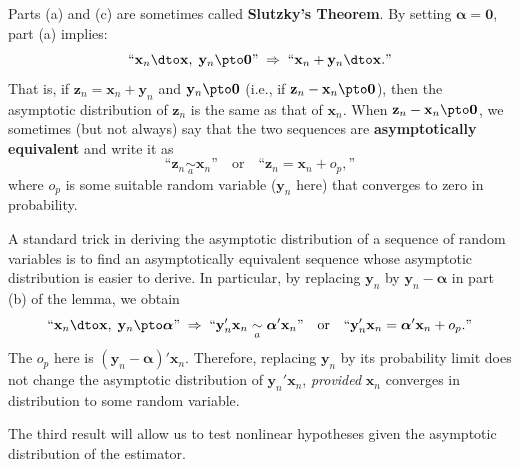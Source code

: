 Parts (a) and (c) are sometimes called \textbf{Slutzky's Theorem}.  By setting
$\bm{\alpha} = \mathbf{0}$, part (a) implies:
\begin{equation}
  \text{``}\mathbf{x}_n \dto \mathbf{x},\;
  \mathbf{y}_n \pto \mathbf{0}\text{''} \;\Rightarrow\;
  \text{``}\mathbf{x}_n + \mathbf{y}_n \dto \mathbf{x}.\text{''}
  \label{eq:2.1.7}
\end{equation}
That is, if $\mathbf{z}_n = \mathbf{x}_n + \mathbf{y}_n$ and
$\mathbf{y}_n \pto \mathbf{0}$ (i.e., if $\mathbf{z}_n - \mathbf{x}_n \pto \mathbf{0}$),
then the asymptotic distribution of $\mathbf{z}_n$ is the same as that of
$\mathbf{x}_n$.  When $\mathbf{z}_n - \mathbf{x}_n \pto \mathbf{0}$, we sometimes
(but not always) say that the two sequences are \textbf{asymptotically equivalent}
and write it as
\[
  \text{``}\mathbf{z}_n \underset{a}{\sim} \mathbf{x}_n\text{''} \quad \text{or} \quad
  \text{``}\mathbf{z}_n = \mathbf{x}_n + o_p,\text{''}
\]
where $o_p$ is some suitable random variable ($\mathbf{y}_n$ here) that converges
to zero in probability.

A standard trick in deriving the asymptotic distribution of a sequence of random
variables is to find an asymptotically equivalent sequence whose asymptotic
distribution is easier to derive.  In particular, by replacing $\mathbf{y}_n$ by
$\mathbf{y}_n - \bm{\alpha}$ in part (b) of the lemma, we obtain
\begin{equation}
  \text{``}\mathbf{x}_n \dto \mathbf{x},\;
  \mathbf{y}_n \pto \bm{\alpha}\text{''} \;\Rightarrow\;
  \text{``}\mathbf{y}_n'\mathbf{x}_n \underset{a}{\sim}
  \bm{\alpha}'\mathbf{x}_n\text{''} \quad \text{or} \quad
  \text{``}\mathbf{y}_n'\mathbf{x}_n = \bm{\alpha}'\mathbf{x}_n + o_p.\text{''}
  \label{eq:2.1.8}
\end{equation}
The $o_p$ here is $(\mathbf{y}_n - \bm{\alpha})'\mathbf{x}_n$.  Therefore,
replacing $\mathbf{y}_n$ by its probability limit does not change the asymptotic
distribution of $\mathbf{y}_n'\mathbf{x}_n$, \emph{provided} $\mathbf{x}_n$
converges in distribution to some random variable.

The third result will allow us to test nonlinear hypotheses given the asymptotic
distribution of the estimator.

